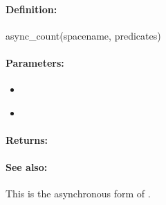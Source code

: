 \paragraph{Definition:}
\begin{rubycode}
async_count(spacename, predicates)
\end{rubycode}

\paragraph{Parameters:}
\begin{itemize}[noitemsep]
\item {}\\

\item {}\\

\end{itemize}

\paragraph{Returns:}


\paragraph{See also:}  This is the asynchronous form of .
